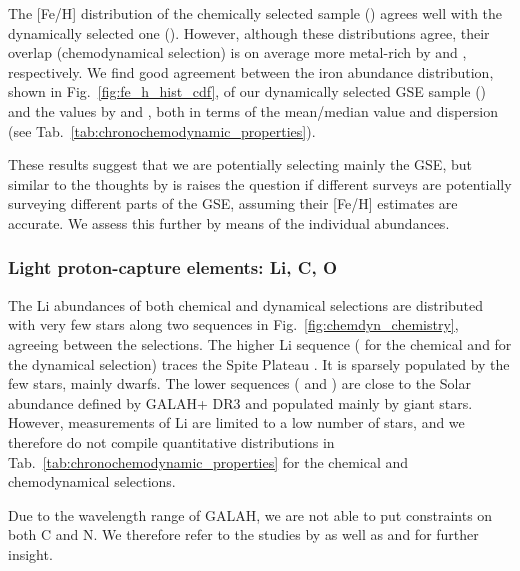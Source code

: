 \documentclass[fleqn,usenatbib]{mnras}
\begin{document}
The [Fe/H] distribution of the chemically selected sample () agrees well with the dynamically selected one (). However, although these distributions agree, their overlap (chemodynamical selection) is on average more metal-rich by  and , respectively. We find good agreement between the iron abundance distribution, shown in Fig.~\ref{fig:fe_h_hist_cdf}, of our dynamically selected GSE sample () and the values by \citet{Naidu2020} and \citet{Feuillet2021}, both in terms of the mean/median value and dispersion (see Tab.~\ref{tab:chronochemodynamic_properties}).

These results suggest that we are potentially selecting mainly the GSE, but similar to the thoughts by \citet{Bonifacio2021} is raises the question if different surveys are potentially surveying different parts of the GSE, assuming their [Fe/H] estimates are accurate. We assess this further by means of the individual abundances.

\subsubsection{Light proton-capture elements: Li, C, O}

The Li abundances of both chemical and dynamical selections are distributed with very few stars along two sequences in Fig.~\ref{fig:chemdyn_chemistry}, agreeing between the selections. The higher Li sequence ( for the chemical and  for the dynamical selection) traces the Spite Plateau \citep{Spite1982}. It is sparsely populated by the few stars, mainly dwarfs. The lower sequences ( and ) are close to the Solar abundance defined by GALAH+ DR3 \citep{Buder2021} and populated mainly by giant stars. However, measurements of Li are limited to a low number of stars, and we therefore do not compile quantitative distributions in Tab.~\ref{tab:chronochemodynamic_properties} for the chemical and chemodynamical selections.

Due to the wavelength range of GALAH, we are not able to put constraints on both C and N. We therefore refer to the studies by \citet{Nissen2014} as well as \citet{Hawkins2015} and \citet{Hayes2018} for further insight.
\end{document}
